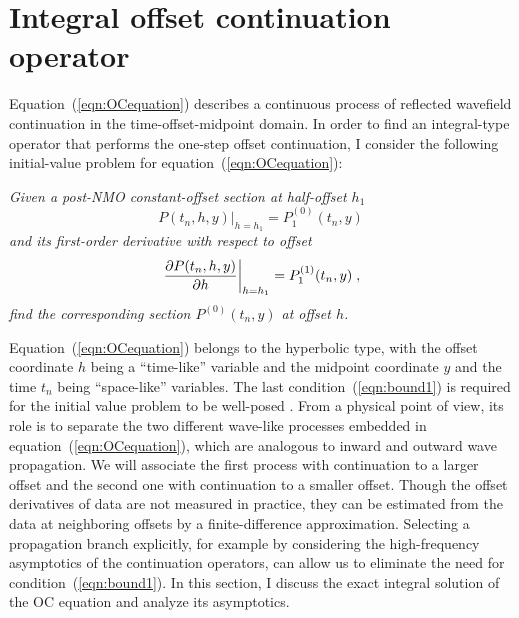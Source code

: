 \section{Integral offset continuation operator}
Equation~(\ref{eqn:OCequation}) describes a continuous process of
reflected wavefield continuation in the time-offset-midpoint domain.
In order to find an integral-type operator that performs the one-step
offset continuation, I consider the following initial-value
problem for equation~(\ref{eqn:OCequation}):

{\em Given a post-NMO constant-offset section at half-offset $h_1$}
\begin{equation}
\left.P(t_n,h,y)\right|_{h=h_1}=P^{(0)}_1(t_n,y) 
\label{eqn:bound0} 
\end{equation}
{\em and its first-order derivative with respect to offset}
\begin{equation}
\left.\partial P(t_n,h,y)\over \partial h\right|_{h=h_1}=P^{(1)}_1(t_n,y)\;, 
\label{eqn:bound1} 
\end{equation}
{\em find the corresponding section $P^{(0)}(t_n,y)$ at offset $h$.}

Equation~(\ref{eqn:OCequation}) belongs to the hyperbolic type, with
the offset coordinate $h$ being a ``time-like'' variable and the
midpoint coordinate $y$ and the time $t_n$ being ``space-like''
variables.  The last condition~(\ref{eqn:bound1}) is required for the
initial value problem to be well-posed \cite[]{kurant}. From a physical
point of view, its role is to separate the two different wave-like
processes embedded in equation~(\ref{eqn:OCequation}), which are
analogous to inward and outward wave propagation. We will associate
the first process with continuation to a larger offset and the second
one with continuation to a smaller offset.  Though the offset
derivatives of data are not measured in practice, they can be
estimated from the data at neighboring offsets by a finite-difference
approximation. Selecting a propagation branch explicitly, for example
by considering the high-frequency asymptotics of the continuation
operators, can allow us to eliminate the need for
condition~(\ref{eqn:bound1}). In this section, I discuss the exact
integral solution of the OC equation and analyze its asymptotics.


